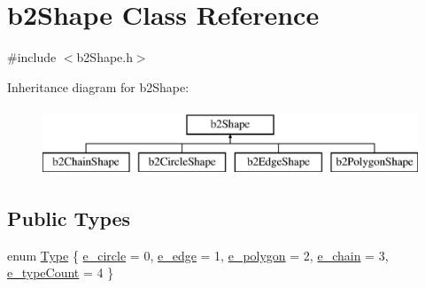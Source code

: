 \hypertarget{classb2_shape}{}\section{b2\+Shape Class Reference}
\label{classb2_shape}


{\ttfamily \#include $<$b2\+Shape.\+h$>$}

Inheritance diagram for b2\+Shape\+:\begin{figure}[H]
\begin{center}
\leavevmode
\includegraphics[height=2.000000cm]{classb2_shape}
\end{center}
\end{figure}
\subsection*{Public Types}
\begin{DoxyCompactItemize}
\item 
enum \mbox{\hyperlink{classb2_shape_a4c1f3a9ad6b3150bb90ad9018ca4b1e0}{Type}} \{ \newline
\mbox{\hyperlink{classb2_shape_a4c1f3a9ad6b3150bb90ad9018ca4b1e0a09ab906cedd1b94ebb6fedb29dace063}{e\+\_\+circle}} = 0, 
\mbox{\hyperlink{classb2_shape_a4c1f3a9ad6b3150bb90ad9018ca4b1e0a707a159824d438c541a452382c0daced}{e\+\_\+edge}} = 1, 
\mbox{\hyperlink{classb2_shape_a4c1f3a9ad6b3150bb90ad9018ca4b1e0a08afe1f3d5964062239783063a3a671f}{e\+\_\+polygon}} = 2, 
\mbox{\hyperlink{classb2_shape_a4c1f3a9ad6b3150bb90ad9018ca4b1e0a3649c133fa23d5af940705432e9170f2}{e\+\_\+chain}} = 3, 
\newline
\mbox{\hyperlink{classb2_shape_a4c1f3a9ad6b3150bb90ad9018ca4b1e0aad7c674a33e8ca4ee9b717f226553596}{e\+\_\+type\+Count}} = 4
 \}
\end{DoxyCompactItemize}
